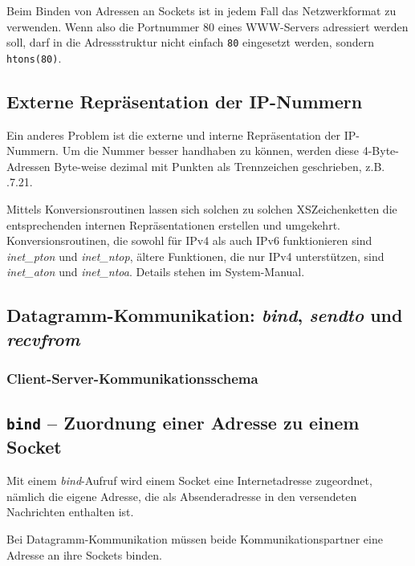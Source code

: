 \documentclass[12pt,utf8]{article}
\begin{document}
Beim Binden von Adressen an Sockets ist in jedem Fall das
Netzwerkformat zu verwenden. Wenn also die Portnummer 80 eines
WWW-Servers adressiert werden soll, darf in die Adressstruktur nicht
einfach {\tt 80} eingesetzt werden, sondern {\tt  htons(80)}.




\subsection*{Externe Repräsentation der IP-Nummern}

Ein anderes Problem ist die externe und interne Repräsentation der IP-Nummern.
Um die Nummer besser handhaben zu können, werden diese 4-Byte-Adressen
Byte-weise dezimal mit Punkten als Trennzeichen geschrieben, z.B.
.7.21\dq.

Mittels Konversionsroutinen lassen sich solchen zu solchen
XSZeichenketten die entsprechenden internen Repräsentationen erstellen
und umgekehrt. Konversionsroutinen, die sowohl für IPv4 als auch IPv6
funktionieren sind {\em inet\_pton\/} und {\em inet\_ntop\/}, ältere
Funktionen, die nur IPv4 unterstützen,
sind {\em inet\_aton\/} und {\em inet\_ntoa\/}. Details stehen im System-Manual.




\subsection*{Datagramm-Kommunikation: {\em bind}, {\em sendto\/} und
{\em recvfrom\/} }

\subsubsection*{Client-Server-Kommunikationsschema}


\begin{center}
\end{center}



\subsection*{{\tt bind} -- Zuordnung einer Adresse zu einem Socket}

Mit einem {\em bind\/}-Aufruf wird einem Socket eine Internetadresse zugeordnet,
nämlich die eigene Adresse, die als Absenderadresse in den versendeten
Nachrichten enthalten ist.

Bei Datagramm-Kommunikation müssen beide Kommunikationspartner eine Adresse
an ihre Sockets binden.
\end{document}
